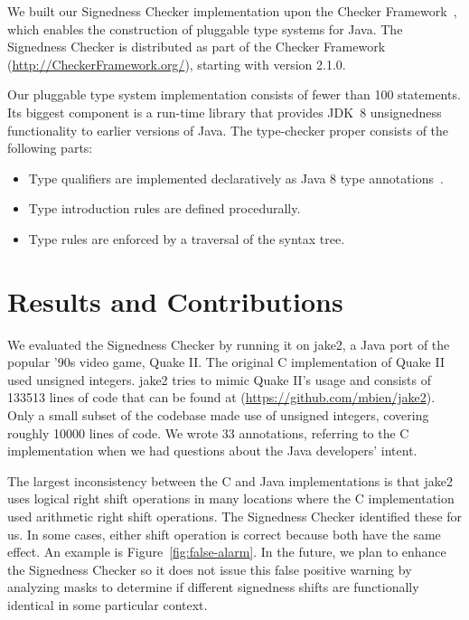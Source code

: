 \documentclass{sig-alternate-05-2015}
\begin{document}
We built our Signedness Checker implementation upon the
Checker Framework~\cite{PapiACPE2008,DietlDEMS2011}, which enables the
construction of pluggable type systems for Java.
The Signedness Checker is distributed as part of the Checker Framework
(\url{http://CheckerFramework.org/}), starting with version 2.1.0.


Our pluggable type system implementation consists of fewer than 100
statements.  Its biggest component is a run-time library that provides
JDK~8 unsignedness functionality to earlier versions of Java.  The
type-checker proper consists of the following parts:

\begin{itemize}\itemsep 0pt \parskip 0pt
  \item Type qualifiers are implemented declaratively as Java 8 type
    annotations~\cite{JSR308-PFD}.
  \item Type introduction rules are defined procedurally.
  \item Type rules are enforced by a traversal of the syntax tree.
\end{itemize}


\section{Results and Contributions}

We evaluated the Signedness Checker by running it on jake2, a Java
port of the popular '90s video game, Quake II\@.  The original C
implementation of Quake II used unsigned integers. jake2
tries to mimic Quake II's usage and consists of 133513 lines of code that
can be found at (\url{https://github.com/mbien/jake2}).
Only a small subset of the codebase made use of unsigned integers, covering roughly
10000 lines of code. We wrote 33 annotations, referring to the
C implementation when we had questions about the Java developers' intent.

The largest inconsistency between the C and Java implementations is that
jake2 uses logical right shift operations
in many locations where the C implementation used arithmetic right shift
operations.  The Signedness Checker identified these for us.
In some cases, either shift operation is correct because both have the same
effect.  An example is Figure~\ref{fig:false-alarm}.  In the future, we
plan to enhance the Signedness Checker so it does not issue this false
positive warning by analyzing masks to determine if different signedness shifts
are functionally identical in some particular context.
\end{document}
